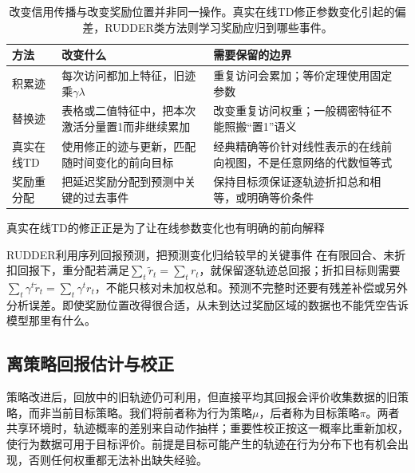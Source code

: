 \begin{table}[t]
  \centering
  \small
  \begin{tabularx}{\linewidth}{>{\raggedright\arraybackslash}p{26mm} >{\raggedright\arraybackslash}X >{\raggedright\arraybackslash}X}
    \toprule
    方法 & 改变什么 & 需要保留的边界 \\
    \midrule
    积累迹 & 每次访问都加上特征，旧迹乘$\gamma\lambda$ & 重复访问会累加；等价定理使用固定参数 \\
    替换迹 & 表格或二值特征中，把本次激活分量置1而非继续累加 & 改变重复访问权重；一般稠密特征不能照搬“置1”语义 \\
    真实在线TD & 使用修正的迹与更新，匹配随时间变化的前向目标 & 经典精确等价针对线性表示的在线前向视图，不是任意网络的代数恒等式 \\
    奖励重分配 & 把延迟奖励分配到预测中关键的过去事件 & 保持目标须保证逐轨迹折扣总和相等，或明确等价条件 \\
    \bottomrule
  \end{tabularx}
  \caption{改变信用传播与改变奖励位置并非同一操作。真实在线TD修正参数变化引起的偏差，RUDDER类方法则学习奖励应归到哪些事件。}
  \label{tab:rl-learning-trace-variants}
\end{table}

真实在线TD的修正正是为了让在线参数变化也有明确的前向解释

RUDDER利用序列回报预测，把预测变化归给较早的关键事件
在有限回合、未折扣回报下，重分配若满足$\sum_t\widetilde r_t=\sum_t r_t$，就保留逐轨迹总回报；折扣目标则需要$\sum_t\gamma^t\widetilde r_t=\sum_t\gamma^t r_t$，不能只核对未加权总和。预测不完整时还要有残差补偿或另外分析误差。即使奖励位置改得很合适，从未到达过奖励区域的数据也不能凭空告诉模型那里有什么。

\subsection{离策略回报估计与校正}
\label{sec:rl-learning-off-policy}

策略改进后，回放中的旧轨迹仍可利用，但直接平均其回报会评价收集数据的旧策略，而非当前目标策略。我们将前者称为行为策略$\mu$，后者称为目标策略$\pi$。两者共享环境时，轨迹概率的差别来自动作抽样；重要性校正按这一概率比重新加权，使行为数据可用于目标评价。前提是目标可能产生的轨迹在行为分布下也有机会出现，否则任何权重都无法补出缺失经验。


